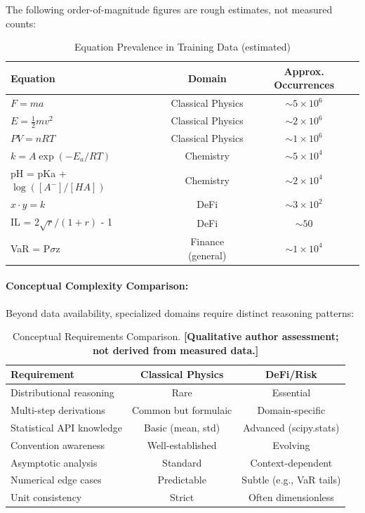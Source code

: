 \documentclass[twoside,11pt]{article}
\begin{document}
The following order-of-magnitude figures are rough estimates, not measured counts:

\begin{table}[H]
\centering
\caption{Equation Prevalence in Training Data (estimated)}
\label{tab:equation_prevalence}
\begin{tabular}{@{}lcc@{}}
\toprule
\textbf{Equation} & \textbf{Domain} & \textbf{Approx. Occurrences} \\
\midrule
$F = ma$ & Classical Physics & $\sim 5 \times 10^6$ \\
$E = \frac{1}{2}mv^2$ & Classical Physics & $\sim 2 \times 10^6$ \\
$PV = nRT$ & Classical Physics & $\sim 1 \times 10^6$ \\
$k = A\exp(-E_a/RT)$ & Chemistry & $\sim 5 \times 10^4$ \\
pH = pKa + $\log([A^{-}]/[HA])$ & Chemistry & $\sim 2 \times 10^4$ \\
$x \cdot y = k$ & DeFi & $\sim 3 \times 10^2$ \\
IL = 2$\sqrt{r}/(1+r)$ - 1 & DeFi & $\sim 50$ \\
VaR = P$\sigma$z & Finance (general) & $\sim 1 \times 10^4$ \\
\bottomrule
\end{tabular}
\end{table}


\paragraph{Conceptual Complexity Comparison:}

Beyond data availability, specialized domains require distinct reasoning patterns:

\begin{table}[H]
\centering
\caption{Conceptual Requirements Comparison.
  \textbf{[Qualitative author assessment; not derived from measured data.]}}
\label{tab:conceptual_complexity}
\begin{tabular}{@{}lcc@{}}
\toprule
\textbf{Requirement} & \textbf{Classical Physics} & \textbf{DeFi/Risk} \\
\midrule
Distributional reasoning & Rare & Essential \\
Multi-step derivations & Common but formulaic & Domain-specific \\
Statistical API knowledge & Basic (mean, std) & Advanced (scipy.stats) \\
Convention awareness & Well-established & Evolving \\
Asymptotic analysis & Standard & Context-dependent \\
Numerical edge cases & Predictable & Subtle (e.g., VaR tails) \\
Unit consistency & Strict & Often dimensionless \\
\bottomrule
\end{tabular}
\end{table}
\end{document}

